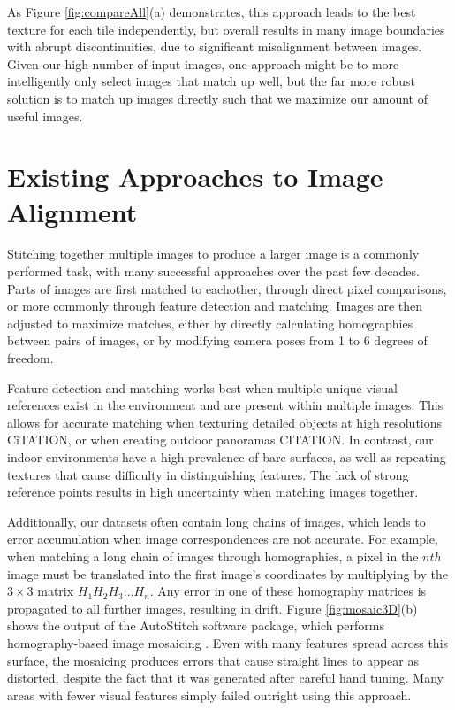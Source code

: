 \documentclass[]{spie}  %
\begin{document}
As Figure \ref{fig:compareAll}(a) demonstrates, this approach leads to
the best texture for each tile independently, but overall results in
many image boundaries with abrupt discontinuities, due to significant
misalignment between images. Given our high number of input images, one approach might be to more intelligently only select images that match up well, but the far more robust solution is to match up images directly such that we maximize our amount of useful images.



\section{Existing Approaches to Image Alignment}
\label{sec:existingApproaches}
Stitching together multiple images to produce a larger image is a
commonly performed task, with many successful approaches over the past
few decades. Parts of images are first matched to eachother, through
direct pixel comparisons, or more commonly through feature detection
and matching. Images are then adjusted to maximize matches, either by
directly calculating homographies between pairs of images, or by
modifying camera poses from 1 to 6 degrees of freedom.

Feature detection and matching works best when multiple unique visual
references exist in the environment and are present within multiple
images. This allows for accurate matching when texturing detailed
objects at high resolutions CiTATION, or when creating outdoor
panoramas CITATION. In contrast, our indoor environments have a high
prevalence of bare surfaces, as well as repeating textures that cause
difficulty in distinguishing features. The lack of strong reference
points results in high uncertainty when matching images together.

Additionally, our datasets often contain long chains of images, which
leads to error accumulation when image correspondences are not
accurate. For example, when matching a long chain of images through
homographies, a pixel in the $nth$ image must be translated into the
first image's coordinates by multiplying by the $3\times3$ matrix $H_1
H_2 H_3 ... H_n$. Any error in one of these homography matrices is
propagated to all further images, resulting in drift. Figure
\ref{fig:mosaic3D}(b) shows the output of the AutoStitch software
package, which performs homography-based image mosaicing
\cite{autostitch}. Even with many features spread across this surface,
the mosaicing produces errors that cause straight lines to appear as
distorted, despite the fact that it was generated after careful hand
tuning. Many areas with fewer visual features simply failed outright
using this approach.
\end{document}
